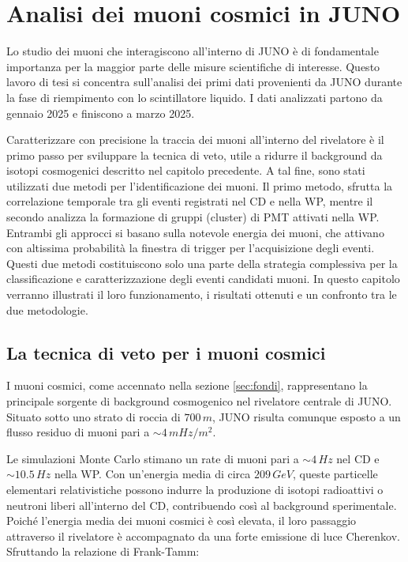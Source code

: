 \chapter{Analisi dei muoni cosmici in JUNO}
\label{cap:muon}
Lo studio dei muoni che interagiscono all'interno di JUNO è di fondamentale importanza per la maggior parte delle misure scientifiche di interesse. Questo lavoro di tesi si concentra sull’analisi dei primi dati provenienti da JUNO durante la fase di riempimento con lo scintillatore liquido. I dati analizzati partono da gennaio 2025 e finiscono a marzo 2025.

Caratterizzare con precisione la traccia dei muoni all’interno del rivelatore è il primo passo per sviluppare la tecnica di veto, utile a ridurre il background da isotopi cosmogenici descritto nel capitolo precedente. A tal fine, sono stati utilizzati due metodi per l'identificazione dei muoni. Il primo metodo, sfrutta la correlazione temporale tra gli eventi registrati nel CD e nella WP, mentre il secondo analizza la formazione di gruppi (cluster) di PMT attivati nella WP. Entrambi gli approcci si basano sulla notevole energia dei muoni, che attivano con altissima  probabilità la finestra di trigger per l'acquisizione degli eventi. Questi due metodi costituiscono solo una parte della strategia complessiva per la classificazione e caratterizzazione degli eventi candidati muoni. In questo capitolo verranno illustrati il loro funzionamento, i risultati ottenuti e un confronto tra le due metodologie.
\section{La tecnica di veto per i muoni cosmici}
I muoni cosmici, come accennato nella sezione \ref{sec:fondi}, rappresentano la principale sorgente di background cosmogenico nel rivelatore centrale di JUNO. Situato sotto uno strato di roccia di $700\,\unit{m}$, JUNO risulta comunque esposto a un flusso residuo di muoni pari a $\sim 4\,\unit{mHz/m^2}$.

Le simulazioni Monte Carlo stimano un rate di muoni pari a $\sim4\,\unit{Hz}$ nel CD e $\sim10.5\,\unit{Hz}$ nella WP. Con un'energia media di circa $209\,\unit{GeV}$, queste particelle elementari relativistiche possono indurre la produzione di isotopi radioattivi o neutroni liberi all'interno del CD, contribuendo così al background sperimentale. Poiché l'energia media dei muoni cosmici è così elevata, il loro passaggio attraverso il rivelatore è accompagnato da una forte emissione di luce Cherenkov. Sfruttando la relazione di Frank-Tamm:

